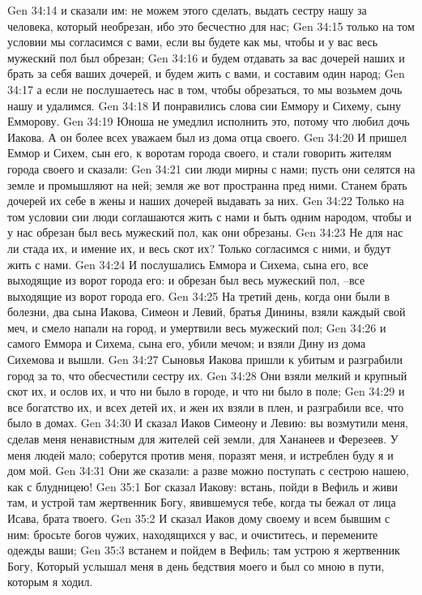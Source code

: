 Gen 34:14  и сказали им: не можем этого сделать, выдать сестру нашу за человека, который необрезан, ибо это бесчестно для нас;
Gen 34:15  только на том условии мы согласимся с вами, если вы будете как мы, чтобы и у вас весь мужеский пол был обрезан;
Gen 34:16  и будем отдавать за вас дочерей наших и брать за себя ваших дочерей, и будем жить с вами, и составим один народ;
Gen 34:17  а если не послушаетесь нас в том, чтобы обрезаться, то мы возьмем дочь нашу и удалимся.
Gen 34:18  И понравились слова сии Еммору и Сихему, сыну Емморову.
Gen 34:19  Юноша не умедлил исполнить это, потому что любил дочь Иакова. А он более всех уважаем был из дома отца своего.
Gen 34:20  И пришел Еммор и Сихем, сын его, к воротам города своего, и стали говорить жителям города своего и сказали:
Gen 34:21  сии люди мирны с нами; пусть они селятся на земле и промышляют на ней; земля же вот пространна пред ними. Станем брать дочерей их себе в жены и наших дочерей выдавать за них.
Gen 34:22  Только на том условии сии люди соглашаются жить с нами и быть одним народом, чтобы и у нас обрезан был весь мужеский пол, как они обрезаны.
Gen 34:23  Не для нас ли стада их, и имение их, и весь скот их? Только согласимся с ними, и будут жить с нами.
Gen 34:24  И послушались Еммора и Сихема, сына его, все выходящие из ворот города его: и обрезан был весь мужеский пол, --все выходящие из ворот города его.
Gen 34:25  На третий день, когда они были в болезни, два сына Иакова, Симеон и Левий, братья Динины, взяли каждый свой меч, и смело напали на город, и умертвили весь мужеский пол;
Gen 34:26  и самого Еммора и Сихема, сына его, убили мечом; и взяли Дину из дома Сихемова и вышли.
Gen 34:27  Сыновья Иакова пришли к убитым и разграбили город за то, что обесчестили сестру их.
Gen 34:28  Они взяли мелкий и крупный скот их, и ослов их, и что ни было в городе, и что ни было в поле;
Gen 34:29  и все богатство их, и всех детей их, и жен их взяли в плен, и разграбили все, что было в домах.
Gen 34:30  И сказал Иаков Симеону и Левию: вы возмутили меня, сделав меня ненавистным для жителей сей земли, для Хананеев и Ферезеев. У меня людей мало; соберутся против меня, поразят меня, и истреблен буду я и дом мой.
Gen 34:31  Они же сказали: а разве можно поступать с сестрою нашею, как с блудницею!
Gen 35:1  Бог сказал Иакову: встань, пойди в Вефиль и живи там, и устрой там жертвенник Богу, явившемуся тебе, когда ты бежал от лица Исава, брата твоего.
Gen 35:2  И сказал Иаков дому своему и всем бывшим с ним: бросьте богов чужих, находящихся у вас, и очиститесь, и перемените одежды ваши;
Gen 35:3  встанем и пойдем в Вефиль; там устрою я жертвенник Богу, Который услышал меня в день бедствия моего и был со мною в пути, которым я ходил.
